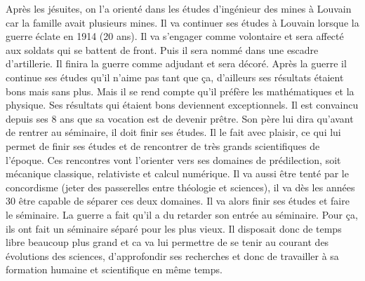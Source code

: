 Après les jésuites, on l'a orienté dans les études d'ingénieur des mines à Louvain car la famille avait plusieurs mines.
Il va continuer ses études à Louvain lorsque la guerre éclate en 1914 (20 ans).
Il va s'engager comme volontaire et sera affecté aux soldats qui se battent de front.
Puis il sera nommé dans une escadre d'artillerie.
Il finira la guerre comme adjudant et sera décoré.
Après la guerre il continue ses études qu'il n'aime pas tant que ça, d'ailleurs ses résultats étaient bons mais sans plus.
Mais il se rend compte qu'il préfère les mathématiques et la physique.
Ses résultats qui étaient bons deviennent exceptionnels.
Il est convaincu depuis ses 8 ans que sa vocation est de devenir prêtre.
Son père lui dira qu'avant de rentrer au séminaire, il doit finir ses études.
Il le fait avec plaisir, ce qui lui permet de finir ses études et de rencontrer de très grands scientifiques de l'époque.
Ces rencontres vont l'orienter vers ses domaines de prédilection, soit mécanique classique, relativiste et calcul numérique.
Il va aussi être tenté par le concordisme (jeter des passerelles entre théologie et sciences), il va dès les années 30 être capable de séparer ces deux domaines.
Il va alors finir ses études et faire le séminaire.
La guerre a fait qu'il a du retarder son entrée au séminaire.
Pour ça, ils ont fait un séminaire séparé pour les plus vieux.
Il disposait donc de temps libre beaucoup plus grand et ca va lui permettre de se tenir au courant des évolutions des sciences, d'approfondir ses recherches et donc de travailler à sa formation humaine et scientifique en même temps.

